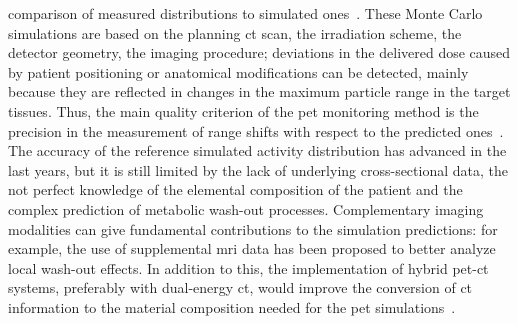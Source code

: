 comparison of measured distributions to simulated ones~\parencite{Ponish2004}. These Monte Carlo simulations are based on the planning \gls{ct} scan, the irradiation scheme, the detector geometry, the imaging procedure; deviations in the delivered dose caused by patient positioning or anatomical modifications can be detected, mainly because they are reflected in changes in the maximum particle range in the target tissues. Thus, the main quality criterion of the \gls{pet} monitoring method is the precision in the measurement of range shifts with respect to the predicted ones~\parencite{Fiedler2010}. The accuracy of the reference simulated activity distribution has advanced in the last years, but it is still limited by the lack of underlying cross-sectional data, the not perfect knowledge of the elemental composition of the patient and the complex prediction of metabolic wash-out processes. Complementary imaging modalities can give fundamental contributions to the simulation predictions: for example, the use of supplemental \gls{mri} data has been proposed to better analyze local wash-out effects. In addition to this, the implementation of hybrid \gls{pet}-\gls{ct} systems, preferably with dual-energy \gls{ct}, would improve the conversion of \gls{ct} information to the material composition needed for the \gls{pet} simulations~\parencite{Landry2013}.  
%
%
